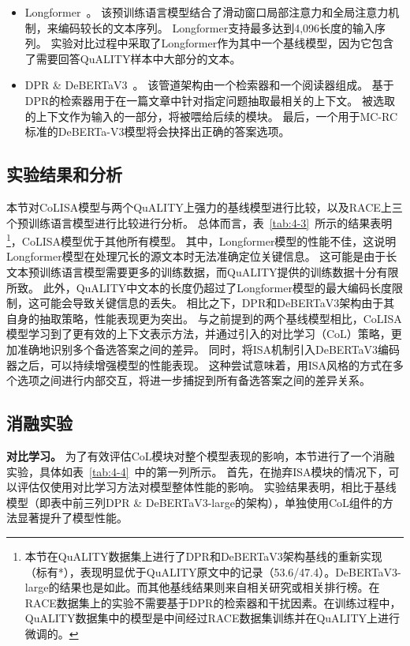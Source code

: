 \begin{itemize}
    \item Longformer~\cite{beltagy2020longformer}。
        该预训练语言模型结合了滑动窗口局部注意力和全局注意力机制，来编码较长的文本序列。
        Longformer支持最多达到4,096长度的输入序列。
        实验对比过程中采取了Longformer作为其中一个基线模型，因为它包含了需要回答QuALITY样本中大部分的文本。
    \item DPR \& DeBERTaV3~\cite{karpukhin2020dense,he2021debertav3}。
        该管道架构由一个检索器和一个阅读器组成。
        基于DPR的检索器用于在一篇文章中针对指定问题抽取最相关的上下文。
        被选取的上下文作为输入的一部分，将被喂给后续的模块。
        最后，一个用于MC-RC标准的DeBERTa-V3模型将会抉择出正确的答案选项。
\end{itemize}

\subsection{实验结果和分析}
本节对CoLISA模型与两个QuALITY上强力的基线模型进行比较，以及RACE上三个预训练语言模型进行比较进行分析。
总体而言，表~\ref{tab:4-3}~所示的结果表明\footnote{本节在QuALITY数据集上进行了DPR和DeBERTaV3架构基线的重新实现（标有*），表现明显优于QuALITY原文中的记录（53.6/47.4）。DeBERTaV3-large的结果也是如此。而其他基线结果则来自相关研究或相关排行榜。在RACE数据集上的实验不需要基于DPR的检索器和干扰因素。在训练过程中，QuALITY数据集中的模型是中间经过RACE数据集训练并在QuALITY上进行微调的。}，CoLISA模型优于其他所有模型。
其中，Longformer模型的性能不佳，这说明Longformer模型在处理冗长的源文本时无法准确定位关键信息。
这可能是由于长文本预训练语言模型需要更多的训练数据，而QuALITY提供的训练数据十分有限所致。
此外，QuALITY中文本的长度仍超过了Longformer模型的最大编码长度限制，这可能会导致关键信息的丢失。
相比之下，DPR和DeBERTaV3架构由于其自身的抽取策略，性能表现更为突出。
与之前提到的两个基线模型相比，CoLISA模型学习到了更有效的上下文表示方法，并通过引入的对比学习（CoL）策略，更加准确地识别多个备选答案之间的差异。
同时，将ISA机制引入DeBERTaV3编码器之后，可以持续增强模型的性能表现。
这种尝试意味着，用ISA风格的方式在多个选项之间进行内部交互，将进一步捕捉到所有备选答案之间的差异关系。



\subsection{消融实验}
\textbf{对比学习。}
为了有效评估CoL模块对整个模型表现的影响，本节进行了一个消融实验，具体如表~\ref{tab:4-4}~中的第一列所示。
首先，在抛弃ISA模块的情况下，可以评估仅使用对比学习方法对模型整体性能的影响。
实验结果表明，相比于基线模型（即表中前三列DPR \& DeBERTaV3-large的架构），单独使用CoL组件的方法显著提升了模型性能。

